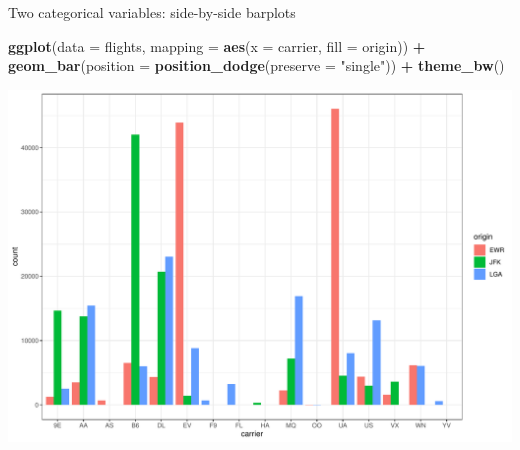 \documentclass[
  ignorenonframetext,
]{beamer}
\newenvironment{Shaded}{\begin{snugshade}}{\end{snugshade}}
\newcommand{\AttributeTok}[1]{\textcolor[rgb]{0.13,0.29,0.53}{#1}}
\newcommand{\FunctionTok}[1]{\textcolor[rgb]{0.13,0.29,0.53}{\textbf{#1}}}
\newcommand{\NormalTok}[1]{#1}
\newcommand{\SpecialCharTok}[1]{\textcolor[rgb]{0.81,0.36,0.00}{\textbf{#1}}}
\newcommand{\StringTok}[1]{\textcolor[rgb]{0.31,0.60,0.02}{#1}}
\begin{document}
\begin{frame}[fragile]{Two categorical variables: side-by-side barplots}
\protect\hypertarget{two-categorical-variables-side-by-side-barplots-2}{}
\tiny

\begin{Shaded}
\begin{Highlighting}[]
\FunctionTok{ggplot}\NormalTok{(}\AttributeTok{data =}\NormalTok{ flights, }\AttributeTok{mapping =} \FunctionTok{aes}\NormalTok{(}\AttributeTok{x =}\NormalTok{ carrier, }\AttributeTok{fill =}\NormalTok{ origin)) }\SpecialCharTok{+}
  \FunctionTok{geom\_bar}\NormalTok{(}\AttributeTok{position =} \FunctionTok{position\_dodge}\NormalTok{(}\AttributeTok{preserve =} \StringTok{"single"}\NormalTok{)) }\SpecialCharTok{+} 
  \FunctionTok{theme\_bw}\NormalTok{()}
\end{Highlighting}
\end{Shaded}

\begin{center}\includegraphics[width=0.9\linewidth,height=0.5\textheight]{Week2_Lect_files/figure-beamer/unnamed-chunk-44-1} \end{center}
\normalsize
\end{frame}
\end{document}
